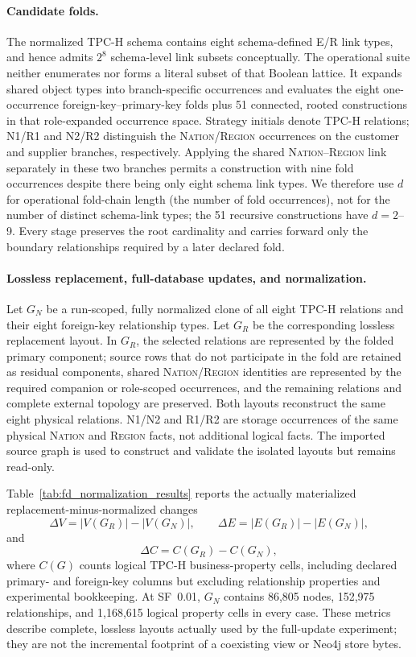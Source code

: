 \documentclass[sigconf]{acmart}
\begin{document}
\paragraph{Candidate folds.}
The normalized TPC-H schema contains eight schema-defined E/R link types, and
hence admits $2^8$ schema-level link subsets conceptually. The operational
suite neither enumerates nor forms a literal subset of that Boolean lattice.
It expands shared object types into branch-specific occurrences and evaluates
the eight one-occurrence foreign-key--primary-key folds plus 51 connected,
rooted constructions in that role-expanded occurrence space. Strategy
initials denote TPC-H relations; N1/R1 and N2/R2 distinguish the
\textsc{Nation}/\textsc{Region} occurrences on the customer and supplier
branches, respectively. Applying the shared \textsc{Nation}--\textsc{Region}
link separately in these two branches permits a construction with nine fold
occurrences despite there being only eight schema link types. We therefore use
$d$ for operational fold-chain length (the number of fold occurrences), not
for the number of distinct schema-link types; the 51 recursive constructions
have $d=2$--9. Every stage preserves the root cardinality and carries forward
only the boundary relationships required by a later declared fold.

\paragraph{Lossless replacement, full-database updates, and normalization.}
Let $G_N$ be a run-scoped, fully normalized clone of all eight TPC-H relations
and their eight foreign-key relationship types. Let $G_R$ be the corresponding
lossless replacement layout. In $G_R$, the selected relations are represented
by the folded primary component; source rows that do not participate in the
fold are retained as residual components, shared \textsc{Nation}/\textsc{Region}
identities are represented by the required companion or role-scoped
occurrences, and the remaining relations and complete external topology are
preserved. Both layouts reconstruct the same eight physical relations. N1/N2
and R1/R2 are storage occurrences of the same physical \textsc{Nation} and
\textsc{Region} facts, not additional logical facts. The imported source graph
is used to construct and validate the isolated layouts but remains read-only.

Table~\ref{tab:fd_normalization_results} reports the actually materialized
replacement-minus-normalized changes
\[
  \Delta V=|V(G_R)|-|V(G_N)|,\qquad
  \Delta E=|E(G_R)|-|E(G_N)|,
\]
and
\[
  \Delta C=C(G_R)-C(G_N),
\]
where $C(G)$ counts logical TPC-H business-property cells, including declared
primary- and foreign-key columns but excluding relationship properties and
experimental bookkeeping. At SF~0.01, $G_N$ contains 86,805 nodes, 152,975
relationships, and 1,168,615 logical property cells in every case. These
metrics describe complete, lossless layouts actually used by the full-update
experiment; they are not the incremental footprint of a coexisting view or
Neo4j store bytes.
\end{document}
